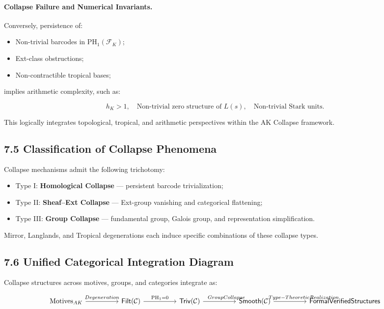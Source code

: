 \documentclass[11pt]{article}
\begin{document}
\paragraph{Collapse Failure and Numerical Invariants.}
Conversely, persistence of:

\begin{itemize}
    \item Non-trivial barcodes in \( \mathrm{PH}_1(\mathcal{F}_K) \);
    \item Ext-class obstructions;
    \item Non-contractible tropical bases;
\end{itemize}

implies arithmetic complexity, such as:

\[
h_K > 1, \quad \text{Non-trivial zero structure of } L(s), \quad \text{Non-trivial Stark units}.
\]

This logically integrates topological, tropical, and arithmetic perspectives within the AK Collapse framework.


\subsection*{7.5 Classification of Collapse Phenomena}

Collapse mechanisms admit the following trichotomy:

\begin{itemize}
    \item Type I: \textbf{Homological Collapse} — persistent barcode trivialization;
    \item Type II: \textbf{Sheaf–Ext Collapse} — Ext-group vanishing and categorical flattening;
    \item Type III: \textbf{Group Collapse} — fundamental group, Galois group, and representation simplification.
\end{itemize}

Mirror, Langlands, and Tropical degenerations each induce specific combinations of these collapse types.

\subsection*{7.6 Unified Categorical Integration Diagram}

Collapse structures across motives, groups, and categories integrate as:

\[
\begin{tikzcd}[column sep=huge]
\mathrm{Motives}_{AK} \arrow[r, "Degeneration"]
& \mathsf{Filt}(\mathcal{C}) \arrow[r, "\mathrm{PH}_1 = 0"]
& \mathsf{Triv}(\mathcal{C}) \arrow[r, "\hspace{2em}Group Collapse"]
& \mathsf{Smooth}(\mathcal{C}) \arrow[r, "\hspace{4em}Type-Theoretic Realization"]
& \mathsf{Formal Verified Structures}
\end{tikzcd}
\]
\end{document}
